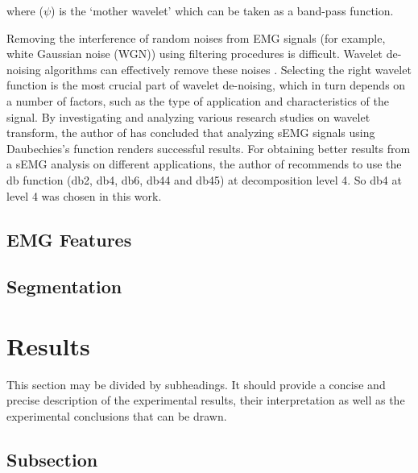 \documentclass[bioengineering,article,submit,moreauthors,pdftex,10pt,a4paper]{mdpi}
\begin{document}
 where ($\psi$) is the ‘mother wavelet’ which can be taken as a band-pass function.
 
 Removing the  interference of random noises from EMG signals (for example, white Gaussian noise (WGN)) using
 filtering procedures is difficult. Wavelet de-noising algorithms can effectively remove these noises \cite{ref-Phinyomark}. Selecting the right wavelet function is the most crucial part of
 wavelet de-noising, which in turn depends on a number of factors, such as the type of application and
 characteristics of the signal. By investigating and analyzing various research studies on wavelet transform, the author of \cite{ref-Chowdhury} has concluded that analyzing sEMG signals using Daubechies’s function renders successful results. For obtaining better results from a sEMG analysis on different applications, the author of \cite{ref-Chowdhury} recommends to use the db function (db2, db4, db6, db44 and db45) at decomposition level 4. So db4 at level 4 was chosen in this work.
 
 \subsection{EMG Features}
 
 
 
 
 \subsection{Segmentation}
 
 
 
 
 
 
 
 
 
 
 
 
 
 
 


 
 
\section{Results}

This section may be divided by subheadings. It should provide a concise and precise description of the experimental results, their interpretation as well as the experimental conclusions that can be drawn.


\subsection{Subsection}
\end{document}
